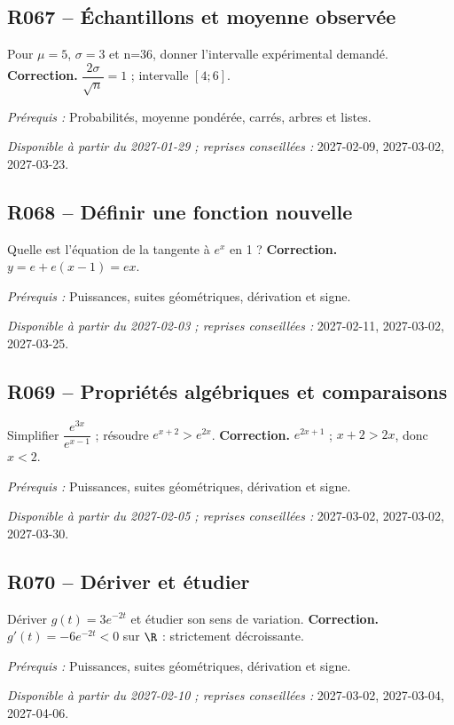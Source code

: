 \subsection*{R067 -- Échantillons et moyenne observée}\label{R067}
Pour $\mu=5$, $\sigma=3$ et n=36, donner l’intervalle expérimental demandé.
\ifprof\textbf{Correction.} $\dfrac{2\sigma}{\sqrt n}=1$ ; intervalle $[4;6]$.\par\textit{Prérequis :} Probabilités, moyenne pondérée, carrés, arbres et listes.\par\textit{Disponible à partir du 2027-01-29 ; reprises conseillées :} 2027-02-09, 2027-03-02, 2027-03-23.\fi
{}\subsection*{R068 -- Définir une fonction nouvelle}\label{R068}
Quelle est l’équation de la tangente à $e^x$ en 1 ?
\ifprof\textbf{Correction.} $y=e+e(x-1)=ex$.\par\textit{Prérequis :} Puissances, suites géométriques, dérivation et signe.\par\textit{Disponible à partir du 2027-02-03 ; reprises conseillées :} 2027-02-11, 2027-03-02, 2027-03-25.\fi
{}\subsection*{R069 -- Propriétés algébriques et comparaisons}\label{R069}
Simplifier $\dfrac{e^{3x}}{e^{x-1}}$ ; résoudre $e^{x+2}>e^{2x}$.
\ifprof\textbf{Correction.} $e^{2x+1}$ ; $x+2>2x$, donc $x<2$.\par\textit{Prérequis :} Puissances, suites géométriques, dérivation et signe.\par\textit{Disponible à partir du 2027-02-05 ; reprises conseillées :} 2027-03-02, 2027-03-02, 2027-03-30.\fi
{}\subsection*{R070 -- Dériver et étudier}\label{R070}
Dériver $g(t)=3e^{-2t}$ et étudier son sens de variation.
\ifprof\textbf{Correction.} $g\prime(t)=-6e^{-2t}<0$ sur $\R$ : strictement décroissante.\par\textit{Prérequis :} Puissances, suites géométriques, dérivation et signe.\par\textit{Disponible à partir du 2027-02-10 ; reprises conseillées :} 2027-03-02, 2027-03-04, 2027-04-06.\fi
